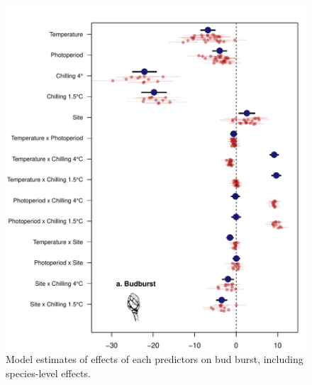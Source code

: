\documentclass{article}
\begin{document}
\begin{figure}
\caption{Model estimates of effects of each predictors on bud burst, including species-level effects.}
\label{figS2}
\includegraphics[scale=0.75, page=1]{Fig1_bb_lo+sp}
\end{figure}

\clearpage
\end{document}
